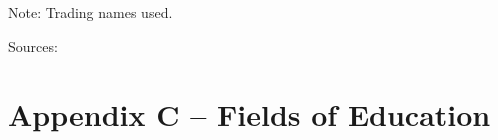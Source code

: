 \documentclass{grattan}
\begin{document}

Note: Trading names used.

Sources: \textcite[][]{TEQSA2018statisticsreporto}

%
\chapter{Appendix C -- Fields of Education}\label{chap:appendix-c-fields-of-education}
\end{document}
